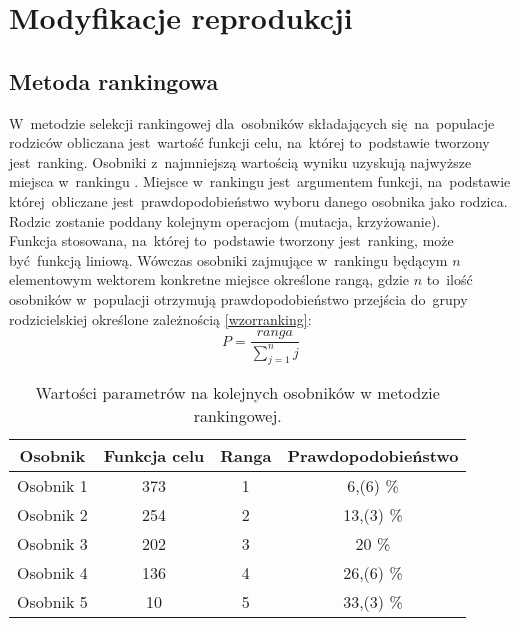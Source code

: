 
\section{Modyfikacje reprodukcji}\label{sec:kompilacja}
\subsection{Metoda rankingowa}\label{sec:kompilacja}


W~metodzie selekcji rankingowej dla~osobników składających się~na~populacje rodziców obliczana jest~wartość funkcji celu, na~której to~podstawie tworzony jest~ranking. Osobniki z~najmniejszą wartością wyniku uzyskują najwyższe miejsca w~rankingu \cite{selekcje}. Miejsce w~rankingu jest~argumentem funkcji, na~podstawie której~obliczane jest~prawdopodobieństwo wyboru danego osobnika jako rodzica. Rodzic zostanie poddany kolejnym operacjom (mutacja, krzyżowanie).\\
Funkcja stosowana, na~której to~podstawie tworzony jest~ranking, może być~funkcją liniową. Wówczas osobniki zajmujące w~rankingu będącym $n$ elementowym wektorem konkretne miejsce określone rangą, gdzie $n$  to~ilość osobników w~populacji otrzymują prawdopodobieństwo przejścia do~grupy rodzicielskiej określone zależnością \ref{wzorranking}:
\begin{equation}
P = \frac{ranga}{\sum_{j=1}^{n}j}
\label{wzorranking}
\end{equation}

\begin{table}[h!]
\begin{center}
\caption{Wartości parametrów na kolejnych osobników w metodzie rankingowej.}
\begin{tabular}{|c|c|c|c|}
\hline
\textbf{Osobnik}  & \textbf{Funkcja celu} & \textbf{Ranga} & \textbf{Prawdopodobieństwo}\\
\hline
Osobnik 1 & 373 & 1 & 6,(6) \% \\
\hline
Osobnik 2 &254 & 2  & 13,(3)  \% \\
\hline
Osobnik 3 & 202 & 3 & 20  \% \\
\hline
Osobnik 4 & 136 & 4 & 26,(6)  \% \\
\hline
Osobnik 5 & 10 & 5 & 33,(3)  \% \\
\hline
\end{tabular}
\end{center}
\end{table}

